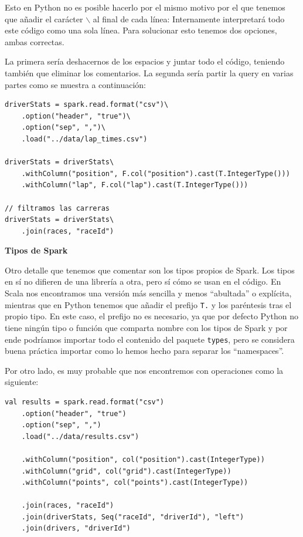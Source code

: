 \documentclass[12pt,twoside,titlepage]{report}
\newcommand{\quotes}[1]{``#1''}
\begin{document}
Esto en Python no es posible hacerlo por el mismo motivo por el que tenemos que añadir el carácter \texttt{$\backslash$} al final de cada línea: Internamente interpretará todo este código como una sola línea. Para solucionar esto tenemos dos opciones, ambas correctas.

La primera sería deshacernos de los espacios y juntar todo el código, teniendo también que eliminar los comentarios. La segunda sería partir la query en varias partes como se muestra a continuación:

\begin{lstlisting}
driverStats = spark.read.format("csv")\
	.option("header", "true")\
	.option("sep", ",")\
	.load("../data/lap_times.csv")
	
driverStats = driverStats\
	.withColumn("position", F.col("position").cast(T.IntegerType())) 
	.withColumn("lap", F.col("lap").cast(T.IntegerType())) 
	
// filtramos las carreras
driverStats = driverStats\
	.join(races, "raceId")
\end{lstlisting}


\textbf{Tipos de Spark}

Otro detalle que tenemos que comentar son los tipos propios de Spark. Los tipos en sí no difieren de una librería a otra, pero sí cómo se usan en el código. En Scala nos encontramos una versión más sencilla y menos \quotes{abultada} o explícita, mientras que en Python tenemos que añadir el prefijo \texttt{T.} y los paréntesis tras el propio tipo. En este caso, el prefijo no es necesario, ya que por defecto Python no tiene ningún tipo o función que comparta nombre con los tipos de Spark y por ende podríamos importar todo el contenido del paquete \texttt{types}, pero se considera buena práctica importar como lo hemos hecho para separar los \quotes{namespaces}. 

Por otro lado, es muy probable que nos encontremos con operaciones como la siguiente:

\begin{lstlisting}
val results = spark.read.format("csv")
	.option("header", "true")
	.option("sep", ",")
	.load("../data/results.csv")

	.withColumn("position", col("position").cast(IntegerType))    
	.withColumn("grid", col("grid").cast(IntegerType))    
	.withColumn("points", col("points").cast(IntegerType))

	.join(races, "raceId")
	.join(driverStats, Seq("raceId", "driverId"), "left")
	.join(drivers, "driverId")
\end{lstlisting}
\end{document}

